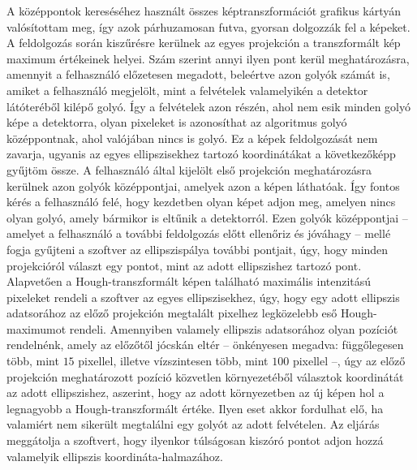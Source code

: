 \documentclass[a4paper,12pt]{article}
\begin{document}
A középpontok kereséséhez használt összes képtranszformációt grafikus kártyán valósítottam meg, így azok párhuzamosan futva, gyorsan dolgozzák fel a képeket. A feldolgozás során kiszűrésre kerülnek az egyes projekción a transzformált kép maximum értékeinek helyei. Szám szerint annyi ilyen pont kerül meghatározásra, amennyit a felhasználó előzetesen megadott, beleértve azon golyók számát is, amiket a felhasználó megjelölt, mint a felvételek valamelyikén a detektor látóteréből kilépő golyó. Így a felvételek azon részén, ahol nem esik minden golyó képe a detektorra,  olyan pixeleket is azonosíthat az algoritmus golyó középpontnak, ahol valójában nincs is golyó. Ez a képek feldolgozását nem zavarja, ugyanis az egyes ellipszisekhez tartozó koordinátákat a következőképp gyűjtöm össze. A felhasználó által kijelölt első projekción meghatározásra kerülnek azon golyók középpontjai, amelyek azon a képen láthatóak. Így fontos kérés a felhasználó felé, hogy kezdetben olyan képet adjon meg, amelyen nincs olyan golyó, amely bármikor is eltűnik a detektorról. Ezen golyók középpontjai -- amelyet a felhasználó a további feldolgozás előtt ellenőriz és jóváhagy -- mellé fogja gyűjteni a szoftver az ellipszispálya további pontjait, úgy, hogy minden projekcióról választ egy pontot, mint az adott ellipszishez tartozó pont. Alapvetően a Hough-transzformált képen található  maximális intenzitású pixeleket rendeli a szoftver az egyes ellipszisekhez, úgy, hogy egy adott ellipszis adatsorához az előző projekción megtalált pixelhez legközelebb eső Hough-maximumot rendeli. Amennyiben valamely ellipszis adatsorához olyan pozíciót rendelnénk, amely az előzőtől jócskán eltér -- önkényesen megadva:  függőlegesen több, mint $15$ pixellel, illetve vízszintesen több, mint $100$ pixellel --, úgy az előző projekción meghatározott pozíció közvetlen környezetéből választok koordinátát az adott ellipszishez, aszerint, hogy az adott környezetben az új képen hol a legnagyobb a Hough-transzformált értéke. Ilyen eset akkor fordulhat elő, ha valamiért nem sikerült megtalálni egy golyót az adott felvételen. Az eljárás meggátolja a szoftvert, hogy ilyenkor túlságosan kiszóró pontot adjon hozzá valamelyik ellipszis koordináta-halmazához.
\end{document}

